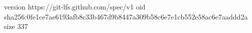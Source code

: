 version https://git-lfs.github.com/spec/v1
oid sha256:0fe1ce7ae6193afb8c33b467d9b8447a309b58c6e7e1cb552e58ac6e7aaddd2a
size 337
